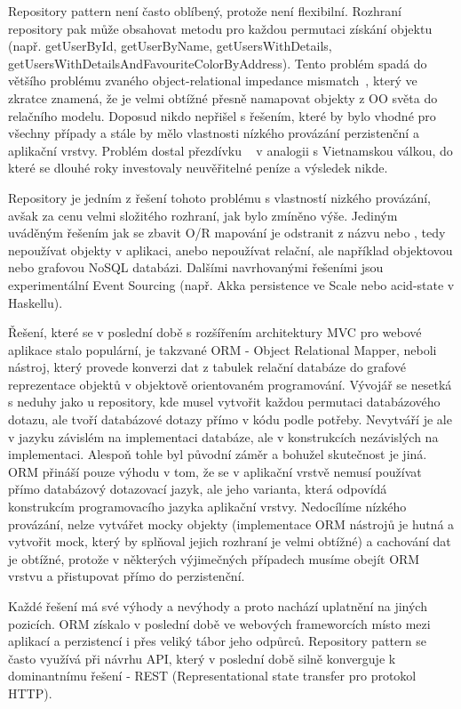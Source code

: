 \documentclass[10pt]{article}
\begin{document}
Repository pattern není často oblíbený, protože není flexibilní. Rozhraní
repository pak může obsahovat metodu pro každou permutaci získání objektu
(např. getUserById, getUserByName, getUsersWithDetails,
getUsersWithDetailsAndFavouriteColorByAddress). Tento problém spadá do většího
problému zvaného object-relational impedance
mismatch~\cite{hibernate_mismatch}\cite{so_mismatch}\cite{ormhate}, který ve
zkratce znamená, že je velmi obtížné přesně namapovat objekty z OO světa do
relačního modelu. Doposud nikdo nepřišel s řešením, které by bylo vhodné pro
všechny případy a stále by mělo vlastnosti nízkého provázání perzistenční a
aplikační vrstvy. Problém dostal přezdívku ~\cite{ormhate}\cite{horror_vietnam} v analogii s Vietnamskou válkou,
do které se dlouhé roky investovaly neuvěřitelné peníze a výsledek nikde. 

Repository je jedním z řešení tohoto problému s vlastností nizkého provázání,
avšak za cenu velmi složitého rozhraní, jak bylo zmíněno výše. Jediným uváděným
řešením jak se zbavit O/R mapování je odstranit z názvu  nebo ,
tedy nepoužívat objekty v aplikaci, anebo nepoužívat relační, ale například
objektovou nebo grafovou NoSQL databázi. Dalšími navrhovanými řešeními jsou
experimentální Event Sourcing (např. Akka persistence ve Scale nebo acid-state
v Haskellu).

Řešení, které se v poslední době s rozšířením architektury MVC pro webové
aplikace stalo populární, je takzvané ORM - Object Relational Mapper, neboli
nástroj, který provede konverzi dat z tabulek relační databáze do grafové
reprezentace objektů v objektově orientovaném programování. Vývojář se nesetká
s neduhy jako u repository, kde musel vytvořit každou permutaci databázového
dotazu, ale tvoří databázové dotazy přímo v kódu podle potřeby. Nevytváří je
ale v jazyku závislém na implementaci databáze, ale v konstrukcích nezávislých
na implementaci. Alespoň tohle byl původní záměr a bohužel skutečnost je jiná.
ORM přináší pouze výhodu v tom, že se v aplikační vrstvě nemusí používat přímo
databázový dotazovací jazyk, ale jeho varianta, která odpovídá konstrukcím
programovacího jazyka aplikační vrstvy. Nedocílíme nízkého provázání, nelze
vytvářet mocky objekty (implementace ORM nástrojů je hutná a vytvořit mock,
který by splňoval jejich rozhraní je velmi obtížné) a cachování dat je obtížné,
protože v některých výjimečných případech musíme obejít ORM vrstvu a
přistupovat přímo do perzistenční.

Každé řešení má své výhody a nevýhody a proto nachází uplatnění na jiných
pozicích.  ORM získalo v poslední době ve webových frameworcích místo mezi
aplikací a perzistencí i přes veliký tábor jeho odpůrců. Repository pattern se
často využívá při návrhu API, který v poslední době silně konverguje k
dominantnímu řešení - REST (Representational state transfer pro protokol HTTP).
\end{document}
